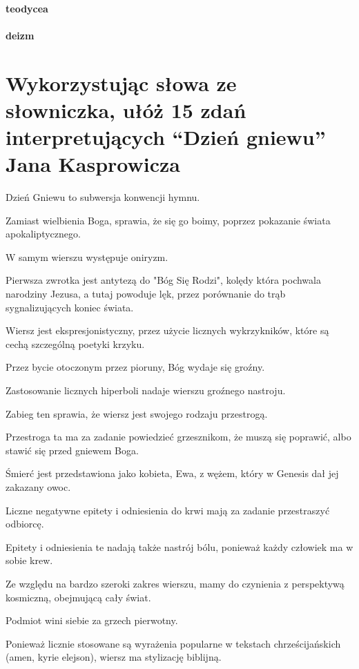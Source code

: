 \documentclass[a4paper]{article}
\begin{document}
    \paragraph*{teodycea}
    \paragraph*{deizm}
\section{Wykorzystując słowa ze słowniczka, ułóż 15 zdań interpretujących ``Dzień gniewu'' Jana Kasprowicza}
Dzień Gniewu to subwersja konwencji hymnu.

Zamiast wielbienia Boga, sprawia, że się go boimy, poprzez pokazanie świata apokaliptycznego.

W samym wierszu występuje oniryzm.

Pierwsza zwrotka jest antytezą do "Bóg Się Rodzi", kolędy która pochwala narodziny Jezusa, a tutaj powoduje lęk, przez porównanie do trąb sygnalizujących koniec świata.

Wiersz jest ekspresjonistyczny, przez użycie licznych wykrzykników, które są cechą szczególną poetyki krzyku.

Przez bycie otoczonym przez pioruny, Bóg wydaje się groźny.

Zastosowanie licznych hiperboli nadaje wierszu groźnego nastroju.

Zabieg ten sprawia, że wiersz jest swojego rodzaju przestrogą.

Przestroga ta ma za zadanie powiedzieć grzesznikom, że muszą się poprawić, albo stawić się przed gniewem Boga.

Śmierć jest przedstawiona jako kobieta, Ewa, z wężem, który w Genesis dał jej zakazany owoc.

Liczne negatywne epitety i odniesienia do krwi mają za zadanie przestraszyć odbiorcę.

Epitety i odniesienia te nadają także nastrój bólu, ponieważ każdy człowiek ma w sobie krew.

Ze względu na bardzo szeroki zakres wierszu, mamy do czynienia z perspektywą kosmiczną, obejmującą cały świat.

Podmiot wini siebie za grzech pierwotny.

Ponieważ licznie stosowane są wyrażenia popularne w tekstach chrześcijańskich (amen, kyrie elejson), wiersz ma stylizację biblijną.
\end{document}
